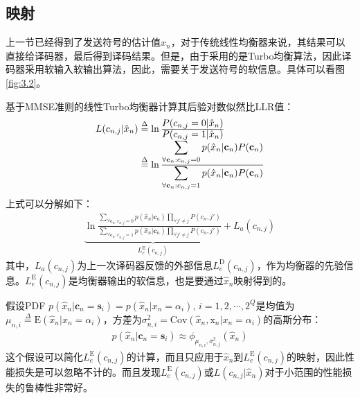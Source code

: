 \subsection{映射}
上一节已经得到了发送符号的估计值$\hat{x}_n$，对于传统线性均衡器来说，其结果可以直接给译码器，最后得到译码结果。但是，由于采用的是Turbo均衡算法，因此译码器采用软输入软输出算法，因此，需要关于发送符号的软信息。具体可以看图\ref{fig:3.2}。

基于MMSE准则的线性Turbo均衡器计算其后验对数似然比LLR值：
\begin{eqnarray}
    \begin{array}{l@{\;\overset{\Delta}{=}\;}l}
        L(c_{n,j}|\hat{x}_n)&\ln\frac{\displaystyle P(c_{n,j}=0|\hat{x}_n)}{\displaystyle P(c_{n,j}=1|\hat{x}_n)}\\
        &\ln\frac{\displaystyle\sum_{\forall\mathbf{c}_n:c_{n,j}=0}p(\hat{x}_n|\mathbf{c}_n)P(\mathbf{c}_n)}{\displaystyle\sum_{\forall\mathbf{c}_n:c_{n,j}=1}p(\hat{x}_n|\mathbf{c}_n)P(\mathbf{c}_n)}
    \end{array}
    \label{equ:3.17}
\end{eqnarray}
上式可以分解如下：
\begin{eqnarray}
      \underbrace{\ln\frac{\displaystyle\sum_{\forall\mathbf{c}_n:c_{n,j}=0}p(\hat{x}_n|\mathbf{c}_n)\prod_{\forall
    {j}'\neq
    j}P(c_n,{j}')}{\displaystyle\sum_{\forall\mathbf{c}_n:c_{n,j}=1}p(\hat{x}_n|\mathbf{c}_n)\prod_{\forall
    {j}'\neq j}P(c_n,{j}')}}_{L_e^{\mathrm{E}}(c_{n,j})}+L_a(c_{n,j})    
    \label{equ:3.18}
\end{eqnarray}
其中，$L_a(c_{n,j})$为上一次译码器反馈的外部信息$L_e^{\mathrm{D}}(c_{n,j})$，作为均衡器的先验信息。$L_e^{\mathrm{E}}(c_{n,j})$是均衡器输出的软信息，也是要通过$\hat{x}_n$映射得到的。

假设PDF
$p(\hat{x}_n|\mathbf{c}_n=\mathbf{s}_i)=p(\hat{x}_n|x_n=\alpha_i),\,i=1,2,\cdots,2^Q$是均值为$\mu_{n,i}\overset{\Delta}{=}\mathrm{E}(\hat{x}_n|x_n=\alpha_i)$，方差为$\sigma_{n,i}^2=\mathrm{Cov}(\hat{x}_n,\mathrm{x}_n|x_n=\alpha_i)$的高斯分布：
\begin{eqnarray}
    p(\hat{x}_n|\mathbf{c}_n=\mathbf{s}_i)\approx\phi_{\mu_{n,i},\sigma_{n,j}^2}(\hat{x}_n)
    \label{equ:3.19}
\end{eqnarray}
这个假设可以简化$L_e^{\mathrm{E}}(c_{n,j})$的计算，而且只应用于$\hat{x}_n$到$L_e^{\mathrm{E}}(c_{n,j})$的映射，因此性能损失是可以忽略不计的。而且发现$L_e^{\mathrm{E}}(c_{n,j})$或$L(c_{n,j}|\hat{x}_n)$对于小范围的性能损失的鲁棒性非常好。

